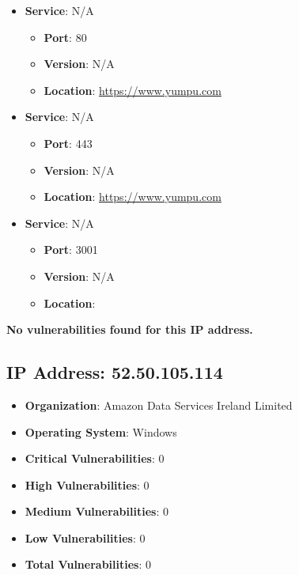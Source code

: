 \documentclass{article}
\begin{document}
\begin{itemize}
    
        \item \textbf{Service}: N/A
        \begin{itemize}
            \item \textbf{Port}: 80
            \item \textbf{Version}:  N/A 
            \item \textbf{Location}: \href{ https://www.yumpu.com }{ https://www.yumpu.com }
        \end{itemize}
    
        \item \textbf{Service}: N/A
        \begin{itemize}
            \item \textbf{Port}: 443
            \item \textbf{Version}:  N/A 
            \item \textbf{Location}: \href{ https://www.yumpu.com }{ https://www.yumpu.com }
        \end{itemize}
    
        \item \textbf{Service}: N/A
        \begin{itemize}
            \item \textbf{Port}: 3001
            \item \textbf{Version}:  N/A 
            \item \textbf{Location}: \href{  }{  }
        \end{itemize}
    
\end{itemize}


\textbf{No vulnerabilities found for this IP address.}




\clearpage



\subsection{IP Address: 52.50.105.114}

\begin{itemize}
    \item \textbf{Organization}: Amazon Data Services Ireland Limited
    \item \textbf{Operating System}:  Windows 
    \item \textbf{Critical Vulnerabilities}: 0
    \item \textbf{High Vulnerabilities}: 0
    \item \textbf{Medium Vulnerabilities}: 0
    \item \textbf{Low Vulnerabilities}: 0
    \item \textbf{Total Vulnerabilities}: 0
\end{itemize}
\end{document}
